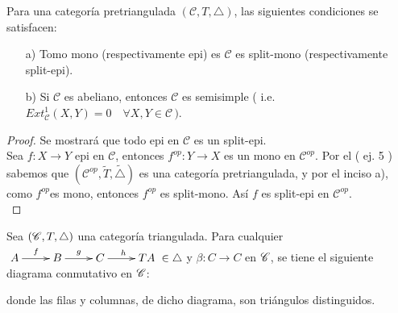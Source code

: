\documentclass{article}
\begin{document}
	\begin{propsn}
		Para una categoría pretriangulada $(\mathscr{C},T,\triangle)$, las siguientes condiciones se satisfacen:
	\begin{itemize}
		\item[a)] Tomo mono (respectivamente epi) es $\mathscr{C}$ es split-mono (respectivamente split-epi).
		\item[b)] Si $\mathscr{C}$ es abeliano, entonces $\mathscr{C}$ es semisimple ( i.e. \\ $Ext^{1}_\mathscr{C}(X,Y)=0\quad \forall X,Y\in \mathscr{C}\,)$.
	\end{itemize}
	\end{propsn}
	\begin{proof}
		Se mostrará que todo epi en $\mathscr{C}$ es un split-epi.\\
		
		Sea $f:X\to Y$ epi en $\mathscr{C}$, entonces $f^{op}:Y\to X$ es un mono en $\mathscr{C}^{op}$. Por el ( ej. 5 ) sabemos que 
		$(\mathscr{C}^{op},\tilde{T},\tilde{\triangle})$ es una categoría pretriangulada, y por el inciso a), como $f^{op}$es mono, entonces $f^{op}$ es 
		split-mono. Así $f$ es split-epi en $\mathscr{C}^{op}$.\\
	\end{proof}
	
	\begin{propsn}
		Sea $(\mathscr{C},T,\triangle)$ una categor\'ia triangulada. Para cualquier 
		$\xymatrix{A\ar[r]^f & B\ar[r]^g & C\ar[r]^h & TA }\in \triangle$ y $\beta:C\to C$ en $\mathscr{C}$, se tiene el siguiente diagrama conmutativo en $\mathscr{C}$:
	\begin{center}
	\end{center}
	donde las filas y columnas, de dicho diagrama, son triángulos distinguidos.
	\end{propsn}
	
\end{document}

